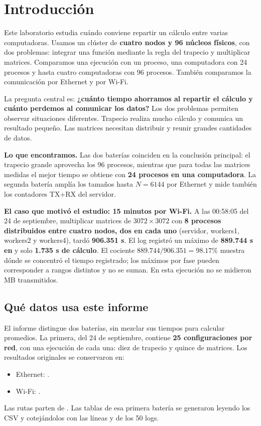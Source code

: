 \section{Introducción}

Este laboratorio estudia cuándo conviene repartir un cálculo entre varias computadoras. Usamos un clúster de \textbf{cuatro nodos y 96 núcleos físicos}, con dos problemas: integrar una función mediante la regla del trapecio y multiplicar matrices. Comparamos una ejecución con un proceso, una computadora con 24 procesos y hasta cuatro computadoras con 96 procesos. También comparamos la comunicación por Ethernet y por Wi-Fi.

La pregunta central es: \textbf{¿cuánto tiempo ahorramos al repartir el cálculo y cuánto perdemos al comunicar los datos?} Los dos problemas permiten observar situaciones diferentes. Trapecio realiza mucho cálculo y comunica un resultado pequeño. Las matrices necesitan distribuir y reunir grandes cantidades de datos.

\begin{idea}
\textbf{Lo que encontramos.} Las dos baterías coinciden en la conclusión principal: el trapecio grande aprovecha los 96 procesos, mientras que para todas las matrices medidas el mejor tiempo se obtiene con \textbf{24 procesos en una computadora}. La segunda batería amplía los tamaños hasta $N=6144$ por Ethernet y mide también los contadores TX+RX del servidor.
\end{idea}

\begin{idea}
\textbf{El caso que motivó el estudio: 15 minutos por Wi-Fi.} A las 00:58:05 del 24 de septiembre, multiplicar matrices de $3072\times3072$ con \textbf{8 procesos distribuidos entre cuatro nodos, dos en cada uno} (servidor, workers1, workers2 y workers4), tardó \textbf{906.351 s}. El log registró un máximo de \textbf{889.744 s en } y solo \textbf{1.735 s de cálculo}. El cociente $889.744/906.351=98.17\%$ muestra dónde se concentró el tiempo registrado; los máximos por fase pueden corresponder a rangos distintos y no se suman. En esta ejecución no se midieron MB transmitidos.
\end{idea}

\subsection{Qué datos usa este informe}
El informe distingue dos baterías, sin mezclar sus tiempos para calcular promedios. La primera, del 24 de septiembre, contiene \textbf{25 configuraciones por red}, con una ejecución de cada una: diez de trapecio y quince de matrices. Los resultados originales se conservaron en:
\begin{itemize}
\item Ethernet: .
\item Wi-Fi: .
\end{itemize}
Las rutas parten de . Las tablas de esa primera batería se generaron leyendo los CSV y cotejándolos con las líneas  y  de los 50 logs.

